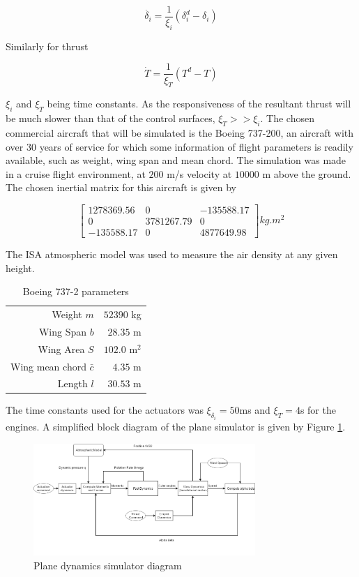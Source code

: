 \begin{equation}
\dot{\delta_i} = \dfrac{1}{\xi_i}(\delta_i^d-\delta_i)
\label{eq:actuator_dynamics}
\end{equation}

Similarly for thrust

\begin{equation}
\dot{T} = \dfrac{1}{\xi_T}(T^d-T)
\end{equation}

$\xi_i$ and $\xi_T$ being time constants. As the responsiveness of the resultant thrust will be much slower than that of the control surfaces, $\xi_T>>\xi_i$.
The chosen commercial aircraft that will be simulated is the Boeing 737-200, an aircraft with over 30 years of service for which some information of flight parameters is readily available, such as weight, wing span and mean chord. The simulation was made in a cruise flight environment, at $200$ m/s velocity at $10000$ m above the ground. The chosen inertial matrix for this aircraft is given by

\begin{equation}
\begin{bmatrix}
1278369.56 & 0 & -135588.17\\
0 & 3781267.79 & 0\\
-135588.17 & 0 & 4877649.98
\end{bmatrix}
kg.m^2
\end{equation}

The ISA atmospheric model was used to measure the air density at any given height.
\begin{table}[htbp]
  \centering
  \caption{Boeing 737-2 parameters}
    \begin{tabular}{rr}
    \toprule
    Weight $m$ & $52390$ kg \\
    Wing Span $b$ & $28.35$ m \\
    Wing Area $S$ & $102.0$ m$^{2}$ \\
    Wing mean chord $\bar{c}$ & $4.35$ m \\
    Length $l$ & $30.53$ m \\
    \bottomrule
    \end{tabular}%
  \label{tab:b737_parameters}
\end{table}%
The time constants used for the actuators was $\xi_{\delta_i}=50$ms and $\xi_T=4$s for the engines. A simplified block diagram of the plane simulator is given by Figure \ref{fig:plane_model}.
\begin{figure}[h]
  \centering
  \includegraphics[width=0.75\textwidth]{../Figures/PlaneModel.png}
  \caption[Plane dynamics simulator diagram]{Plane dynamics simulator diagram}
  \label{fig:plane_model}
\end{figure}
